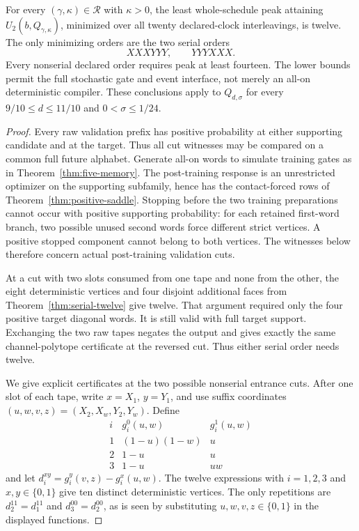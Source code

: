 \begin{theorem}
\label{thm:all-clock-orders}
For every $(\gamma,\kappa)\in\mathcal R$ with $\kappa>0$, the least
whole-schedule peak attaining $U_2(b,Q_{\gamma,\kappa})$, minimized over
all twenty declared-clock interleavings, is twelve. The only minimizing
orders are the two serial orders
\[
                         XXXYYY,\qquad YYYXXX.
\]
Every nonserial declared order requires peak at least fourteen.
The lower bounds permit the full stochastic gate and event interface,
not merely an all-on deterministic compiler. These conclusions apply
to $Q_{d,\sigma}$ for every $9/10\le d\le11/10$ and
$0<\sigma\le1/24$.
\end{theorem}
\begin{proof}
Every raw validation prefix has positive probability at either
supporting candidate and at the target. Thus all cut witnesses may be
compared on a common full future alphabet. Generate all-on words to
simulate training gates as in Theorem~\ref{thm:five-memory}. The
post-training response is an unrestricted optimizer on the supporting
subfamily, hence has the contact-forced rows of
Theorem~\ref{thm:positive-saddle}. Stopping before the two training
preparations cannot occur with positive supporting probability: for
each retained first-word branch, two possible unused second words force
different strict vertices. A positive stopped component cannot belong
to both vertices. The witnesses below therefore concern actual
post-training validation cuts.

At a cut with two slots consumed from one tape and none from the other,
the eight deterministic vertices and four disjoint additional faces
from Theorem~\ref{thm:serial-twelve} give twelve. That argument required
only the four positive target diagonal words. It is still valid with
full target support. Exchanging the two raw tapes negates the output
and gives exactly the same channel-polytope certificate at the reversed
cut. Thus either serial order needs twelve.

We give explicit certificates at the two possible nonserial entrance
cuts. After one slot of each tape, write $x=X_1$, $y=Y_1$, and use
suffix coordinates $(u,w,v,z)=(X_2,X_w,Y_2,Y_w)$. Define
\[
 \begin{array}{c|cc}
 i&g_i^0(u,w)&g_i^1(u,w)\\\hline
 1&(1-u)(1-w)&u\\
 2&1-u&u\\
 3&1-u&uw
 \end{array}
\]
and let $d_i^{xy}=g_i^y(v,z)-g_i^x(u,w)$.
The twelve expressions with $i=1,2,3$ and $x,y\in\{0,1\}$ give
ten distinct deterministic vertices. The only repetitions are
$d_2^{11}=d_1^{11}$ and $d_3^{00}=d_2^{00}$, as is seen by substituting
$u,w,v,z\in\{0,1\}$ in the displayed functions.


\end{proof}
